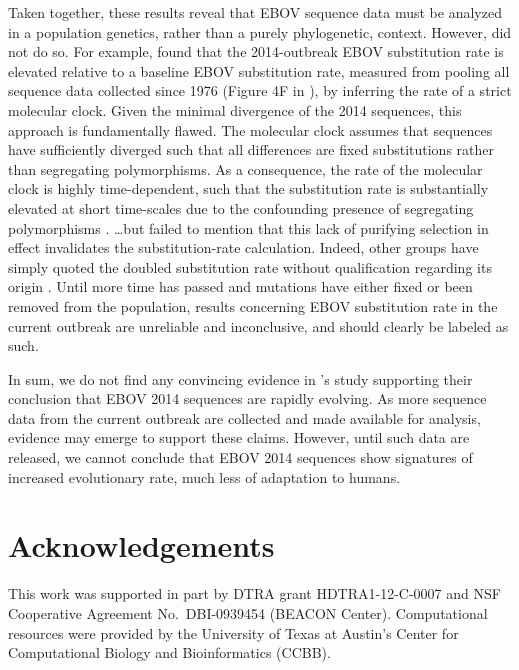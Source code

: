\documentclass[11pt]{article}
\begin{document}
{\color{blue}Taken together, these results reveal that EBOV sequence data must be analyzed in a population genetics, rather than a purely phylogenetic, context. However, \citet{Gire2014} did not do so. For example, \citet{Gire2014} found that the 2014-outbreak EBOV substitution rate is elevated relative to a baseline EBOV substitution rate, measured from pooling all sequence data collected since 1976 (Figure 4F in \citealt{Gire2014}), by inferring the rate of a strict molecular clock. Given the minimal divergence of the 2014 sequences, this approach is fundamentally flawed. The molecular clock assumes that sequences have sufficiently diverged such that all differences are fixed substitutions rather than segregating polymorphisms. As a consequence, the rate of the molecular clock is highly time-dependent, such that the substitution rate is substantially elevated at short time-scales due to the confounding presence of segregating polymorphisms \citep{Hoetal2005, Hoetal2007, PetersonMasel2009, Hoetal2011}. \dots but failed to mention that this lack of purifying selection in effect invalidates the substitution-rate calculation. Indeed, other groups have simply quoted the doubled substitution rate without qualification regarding its origin \citep{Alexanderetal2014}. 
Until more time has passed and mutations have either fixed or been removed from the population, results concerning EBOV substitution rate in the current outbreak are unreliable and inconclusive, and should clearly be labeled as such.
}

{\color{blue}In sum, we do not find any convincing evidence in \citet{Gire2014}'s study supporting their conclusion that EBOV 2014 sequences are rapidly evolving. As more sequence data from the current outbreak are collected and made available for analysis, evidence may emerge to support these claims. However, until such data are released, we cannot conclude that EBOV 2014 sequences show signatures of increased evolutionary rate, much less of adaptation to humans.}

\section*{Acknowledgements}
This work was supported in part by DTRA grant HDTRA1-12-C-0007 and NSF Cooperative Agreement No.\ DBI-0939454 (BEACON Center). Computational resources were provided by the University of Texas at Austin's Center for Computational Biology and Bioinformatics (CCBB).
\end{document}
